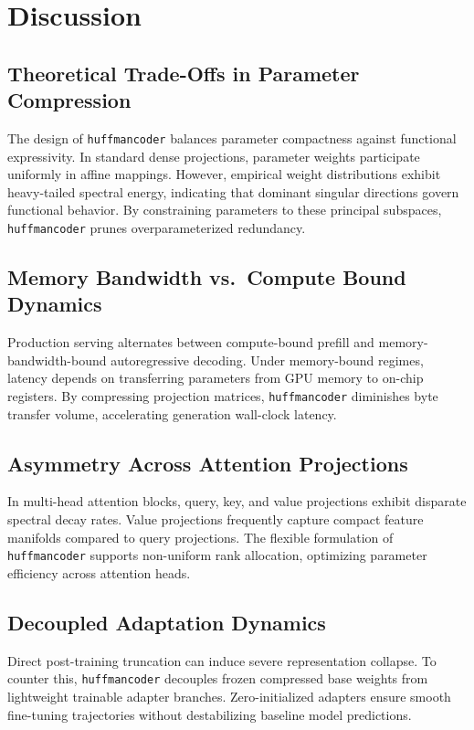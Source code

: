 \section{Discussion}

\subsection{Theoretical Trade-Offs in Parameter Compression}
The design of \texttt{huffmancoder} balances parameter compactness against functional expressivity. In standard dense projections, parameter weights participate uniformly in affine mappings. However, empirical weight distributions exhibit heavy-tailed spectral energy, indicating that dominant singular directions govern functional behavior. By constraining parameters to these principal subspaces, \texttt{huffmancoder} prunes overparameterized redundancy.

\subsection{Memory Bandwidth vs.\ Compute Bound Dynamics}
Production serving alternates between compute-bound prefill and memory-bandwidth-bound autoregressive decoding. Under memory-bound regimes, latency depends on transferring parameters from GPU memory to on-chip registers. By compressing projection matrices, \texttt{huffmancoder} diminishes byte transfer volume, accelerating generation wall-clock latency.

\subsection{Asymmetry Across Attention Projections}
In multi-head attention blocks, query, key, and value projections exhibit disparate spectral decay rates. Value projections frequently capture compact feature manifolds compared to query projections. The flexible formulation of \texttt{huffmancoder} supports non-uniform rank allocation, optimizing parameter efficiency across attention heads.

\subsection{Decoupled Adaptation Dynamics}
Direct post-training truncation can induce severe representation collapse. To counter this, \texttt{huffmancoder} decouples frozen compressed base weights from lightweight trainable adapter branches. Zero-initialized adapters ensure smooth fine-tuning trajectories without destabilizing baseline model predictions.

